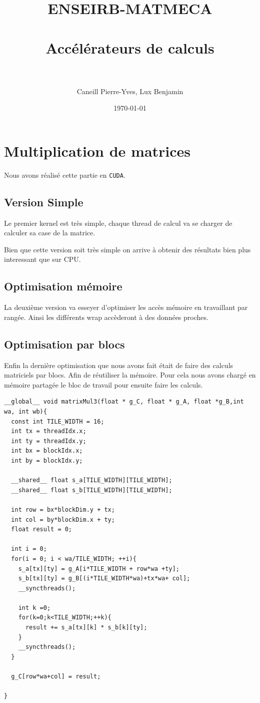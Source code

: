 \documentclass[paper=a4, fontsize=11pt]{scrartcl} %
\title{	
\normalfont \normalsize 
\textsc{ENSEIRB-MATMECA} \\ [25pt] %
\horrule{0.5pt} \\[0.4cm] %
\huge Accélérateurs de calculs \\ %
\horrule{2pt} \\[0.5cm] %
}
\author{Caneill Pierre-Yves, Lux Benjamin} %
\date{\normalsize\today} %
\numberwithin{equation}{section} %
\numberwithin{figure}{section} %
\numberwithin{table}{section} %
\begin{document}
\maketitle %


\section{Multiplication de matrices}
Nous avons réalisé cette partie en \verb!CUDA!.
\subsection{Version Simple}
Le premier kernel est très simple, chaque thread de calcul va se
charger de calculer sa case de la matrice.

Bien que cette version soit très simple on arrive à obtenir des
résultats bien plus interessant que sur CPU.

\subsection{Optimisation mémoire}
La deuxième version va esseyer d'optimiser les accès mémoire en
travaillant par rangée. Ainsi les différents wrap accèderont à des
données proches.

\subsection{Optimisation par blocs}
Enfin la dernière optimisation que nous avons fait était de faire des
calculs matriciels par blocs. Afin de réutiliser la mémoire. Pour cela
nous avons chargé en mémoire partagée le bloc de travail pour ensuite
faire les calculs.

\begin{lstlisting}
__global__ void matrixMul3(float * g_C, float * g_A, float *g_B,int wa, int wb){
  const int TILE_WIDTH = 16;
  int tx = threadIdx.x;
  int ty = threadIdx.y;
  int bx = blockIdx.x;
  int by = blockIdx.y;

  __shared__ float s_a[TILE_WIDTH][TILE_WIDTH];
  __shared__ float s_b[TILE_WIDTH][TILE_WIDTH];

  int row = bx*blockDim.y + tx;
  int col = by*blockDim.x + ty;
  float result = 0;

  int i = 0;
  for(i = 0; i < wa/TILE_WIDTH; ++i){
    s_a[tx][ty] = g_A[i*TILE_WIDTH + row*wa +ty];
    s_b[tx][ty] = g_B[(i*TILE_WIDTH*wa)+tx*wa+ col];
    __syncthreads();

    int k =0;
    for(k=0;k<TILE_WIDTH;++k){
      result += s_a[tx][k] * s_b[k][ty];
    }
    __syncthreads();
  }

  g_C[row*wa+col] = result;

}
\end{lstlisting}
\end{document}
